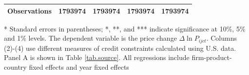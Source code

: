 \documentclass[12pt]{article}
\begin{document}
\begin{table}[htbp]
\begin{threeparttable}
\begin{tabular}{lcccc}
			Observations & 1793974 & 1793974 & 1793974 & 1793974 \\
			\bottomrule
		\end{tabular}
		\begin{tablenotes}
			\footnotesize
			\item[*] Standard errors in parentheses; *, **, and *** indicate significance at 10\%, 5\% and 1\% levels. The dependent variable is the price change $\Delta \ln P_{ijct}$. Columns (2)-(4) use different measures of credit constraints calculated using U.S. data. Panel A is shown in Table \ref{tab.source}. All regressions include firm-product-country fixed effects and year fixed effects
		\end{tablenotes}
	\end{threeparttable}
	\label{tabA.1}
\end{table}
\end{document}
